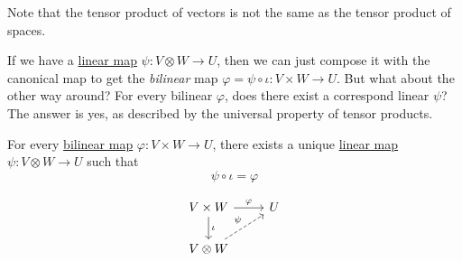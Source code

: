 	Note that the tensor product of vectors is not the same as the tensor product of spaces. 

	If we have a \hyperref[def:linear_map]{linear map} $\psi: V \otimes W \to U$, then we can just compose it with the canonical map to get the \textit{bilinear} map $\varphi = \psi \circ \iota : V \times W \to U$. But what about the other way around? For every bilinear $\varphi$, does there exist a correspond linear $\psi$? The answer is yes, as described by the universal property of tensor products. 

  \begin{theorem}
		\label{thm:universal_tensor}
		For every \hyperref[def:bilinear-map]{bilinear map} $\varphi: V \times W \to U$, there exists a unique \hyperref[def:linear_map]{linear map} $\psi: V \otimes W \to U$ such that 
		\begin{equation}
		  \psi \circ \iota = \varphi
		\end{equation}

		\begin{figure}[H]
			\centering 
			\begin{equation}
			  \begin{tikzcd}
			  				V \times W \arrow[r, "\varphi"] \arrow[d, "\iota"] & U \\
			  				V \otimes W \arrow[ru, dashed, "\psi"]
			  			\end{tikzcd}
			\end{equation}
			\caption{} 
			\label{fig:universal_tensor_prod}
		\end{figure}
  \end{theorem}
